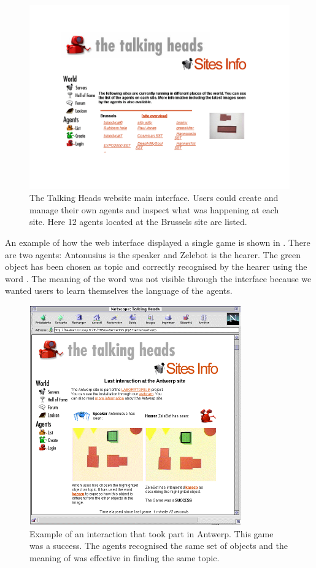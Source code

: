 \begin{figure}[htb]
  \centerline{\includegraphics[width=.85\textwidth]{chap8/figures/th-website.pdf}}
\caption{\label{fig:thwebsite}The Talking Heads website main interface. Users could create and manage their own agents and inspect what was happening 
at each site. Here 12 agents located at the Brussels site are listed.}
\end{figure}

An example of how the web interface displayed a single game is shown in . 
There are two agents: Antonusius is the speaker and Zelebot is the hearer. 
The green object has been chosen as topic and correctly 
recognised by the hearer using the word . The meaning of the word was not visible through the interface because we 
wanted users to learn themselves the language of the agents. 


\begin{figure}[htb]
  \centerline{\includegraphics[width=.85\textwidth]{chap8/figures/zelebot.pdf}}
\caption{\label{fig:thwebsite-agent}Example of an interaction that took part in Antwerp. This game was a success. The agents recognised the same
set of objects and the meaning of  was effective in finding the same topic. 
}
\end{figure}

